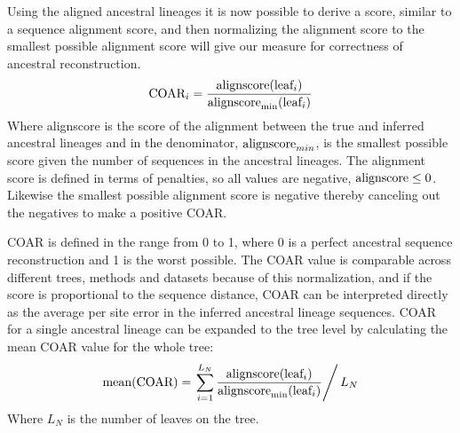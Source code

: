 

Using the aligned ancestral lineages it is now possible to derive a score, similar to a sequence alignment score, and then normalizing the alignment score to the smallest possible alignment score will give our measure for correctness of ancestral reconstruction.
$$
\text{COAR}_i = \frac{\text{alignscore}(\text{leaf}_i)}{\text{alignscore}_{\min}(\text{leaf}_i)}
$$
Where alignscore is the score of the alignment between the true and inferred ancestral lineages and in the denominator, $\text{alignscore}_{min}$, is the smallest possible score given the number of sequences in the ancestral lineages.
The alignment score is defined in terms of penalties, so all values are negative, $\text{alignscore} \leq 0$.
Likewise the smallest possible alignment score is negative thereby canceling out the negatives to make a positive COAR.

COAR is defined in the range from 0 to 1, where 0 is a perfect ancestral sequence reconstruction and 1 is the worst possible.
The COAR value is comparable across different trees, methods and datasets because of this normalization, and if the score is proportional to the sequence distance, COAR can be interpreted directly as the average per site error in the inferred ancestral lineage sequences.
COAR for a single ancestral lineage can be expanded to the tree level by calculating the mean COAR value for the whole tree:
$$
\operatorname{mean}(\text{COAR}) = \left. \sum^{L_N}_{i=1} \frac{\text{alignscore}(\text{leaf}_i)}{\text{alignscore}_{\min}(\text{leaf}_i)} \right/ L_N
$$
Where $L_N$ is the number of leaves on the tree.




